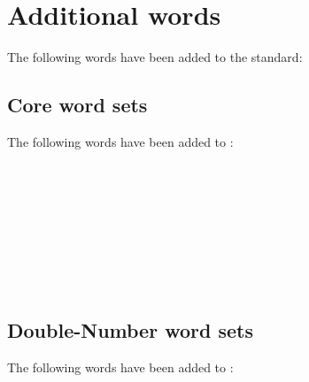 
\section{Additional words} %
\label{diff:new12}

The following words have been added to the standard:

\setcounter{subsection}{5}
\subsection{Core word sets}
The following words have been added to :

\begin{minipage}[t]{0.3\linewidth}
	 \\
	 \\
\end{minipage}
\hfill
\begin{minipage}[t]{0.3\linewidth}
	 \\
	 \\
\end{minipage}
\hfill
\begin{minipage}[t]{0.3\linewidth}
	 \\
	 \\
\end{minipage}


\pagebreak
\subsection[Block word sets]{}

\subsection{Double-Number word sets}
The following words have been added to :


\subsection[Exception word sets]{}

